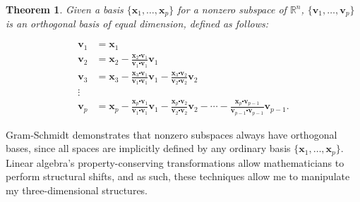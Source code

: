 \documentclass[letterpaper, 12pt]{article}
\newtheorem{thm}{Theorem}[section]
\begin{document}
\begin{thm} Given a basis $\{\mathbf{x}_1, \ldots, \mathbf{x}_p\}$ for a nonzero subspace of $\mathbb{R}^n$, $\{\mathbf{v}_1, \ldots, \mathbf{v}_p\}$ is an orthogonal basis of equal dimension, defined as follows:

	\vspace*{-14mm}
	\begin{align*}
		\mathbf{v}_1 &= \mathbf{x}_1 \\
		\mathbf{v}_2 &= \mathbf{x}_2 - \frac{\mathbf{x}_2 \centerdot \mathbf{v}_1}{\mathbf{v}_1 \centerdot \mathbf{v}_1} \mathbf{v}_1 \\
		\mathbf{v}_3 &= \mathbf{x}_3 - \frac{\mathbf{x}_3 \centerdot \mathbf{v}_1}{\mathbf{v}_1 \centerdot \mathbf{v}_1} \mathbf{v}_1 - \frac{\mathbf{x}_3 \centerdot \mathbf{v}_2}{\mathbf{v}_2 \centerdot \mathbf{v}_2} \mathbf{v}_2 \\
		\vdots \ \ & \\
		\mathbf{v}_p &= \mathbf{x}_p - \frac{\mathbf{x}_p \centerdot \mathbf{v}_1}{\mathbf{v}_1 \centerdot \mathbf{v}_1} \mathbf{v}_1 - \frac{\mathbf{x}_p \centerdot \mathbf{v}_2}{\mathbf{v}_2 \centerdot \mathbf{v}_2} \mathbf{v}_2 -  \cdots - \frac{\mathbf{x}_p \centerdot \mathbf{v}_{p-1}}{\mathbf{v}_{p-1} \centerdot \mathbf{v}_{p-1}} \mathbf{v}_{p-1}.
	\end{align*}
\end{thm}

\noindent Gram-Schmidt demonstrates that nonzero subspaces always have orthogonal bases, since all spaces are implicitly defined by any ordinary basis $\{\mathbf{x}_1, \ldots, \mathbf{x}_p\}$. Linear algebra's property-conserving transformations allow mathematicians to perform structural shifts, and as such, these techniques allow me to manipulate my three-dimensional structures.
\end{document}
